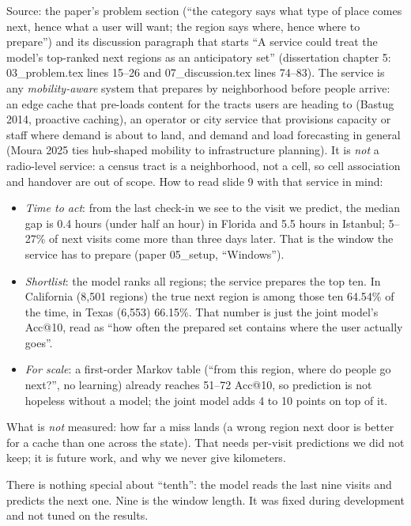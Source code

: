 Source: the paper's problem section (``the category says what type of place comes next, hence what a
user will want; the region says where, hence where to prepare'') and its discussion paragraph that
starts ``A service could treat the model's top-ranked next regions as an anticipatory set''
(dissertation chapter 5: 03\_problem.tex lines 15--26 and 07\_discussion.tex lines 74--83).
The service is any \emph{mobility-aware} system that prepares by neighborhood before people arrive:
an edge cache that pre-loads content for the tracts users are heading to (Bastug 2014, proactive
caching), an operator or city service that provisions capacity or staff where demand is about to land,
and demand and load forecasting in general (Moura 2025 ties hub-shaped mobility to infrastructure
planning). It is \emph{not} a radio-level service: a census tract is a neighborhood, not a cell, so
cell association and handover are out of scope.
How to read slide 9 with that service in mind:
\begin{itemize}
  \item \emph{Time to act}: from the last check-in we see to the visit we predict, the median gap is
        0.4 hours (under half an hour) in Florida and 5.5 hours in Istanbul; 5--27\% of next visits come more than
        three days later. That is the window the service has to prepare (paper 05\_setup, ``Windows'').
  \item \emph{Shortlist}: the model ranks all regions; the service prepares the top ten. In California
        (8,501 regions) the true next region is among those ten 64.54\% of the time, in Texas (6,553)
        66.15\%. That number is just the joint model's Acc@10, read as ``how often the prepared set
        contains where the user actually goes''.
  \item \emph{For scale}: a first-order Markov table (``from this region, where do people go next?'',
        no learning) already reaches 51--72 Acc@10, so prediction is not hopeless without a model; the
        joint model adds 4 to 10 points on top of it.
\end{itemize}
What is \emph{not} measured: how far a miss lands (a wrong region next door is better for a cache
than one across the state). That needs per-visit predictions we did not keep; it is future work, and
why we never give kilometers.

There is nothing special about ``tenth'': the model reads the last nine visits and predicts the next
one. Nine is the window length. It was fixed during development and not tuned on the results.

